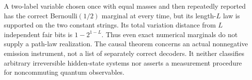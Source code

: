 \begin{remark}\label{rem:correlation59}
A two-label variable chosen once with equal masses and then repeatedly
reported has the correct Bernoulli$(1/2)$ marginal at every time, but its
length-$L$ law is supported on the two constant strings. Its total
variation distance from $L$ independent fair bits is $1-2^{1-L}$.
Thus even exact numerical marginals do not supply a path-law realization.
The causal theorem concerns an actual nonnegative emission instrument,
not a list of separately correct decoders. It neither classifies
arbitrary irreversible hidden-state systems nor asserts a measurement
procedure for noncommuting quantum observables.
\end{remark}
